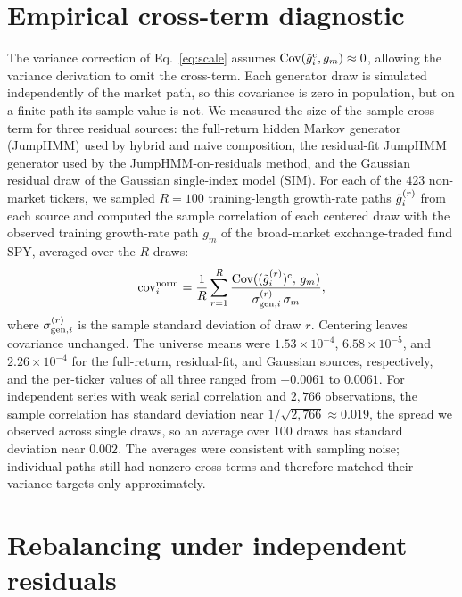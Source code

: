 
\section{Empirical cross-term diagnostic}
\label{sec:supp-cov}

The variance correction of Eq.~\eqref{eq:scale} assumes
$\operatorname{Cov}(\tilde{g}_i^{\mathrm c},g_m)\approx0$, allowing the variance derivation to omit
the cross-term. Each generator draw is simulated independently of the
market path, so this covariance is zero in population, but on a
finite path its sample value is not. We measured the size of the
sample cross-term for three residual sources: the full-return
hidden Markov generator (JumpHMM) used by hybrid and naive composition,
the residual-fit JumpHMM generator used by the JumpHMM-on-residuals
method, and the Gaussian residual draw of the Gaussian single-index model (SIM). For each
of the $423$ non-market tickers, we sampled $R = 100$ training-length
growth-rate paths $\tilde{g}_i^{(r)}$ from each source and computed the
sample correlation of each centered draw with the observed training
growth-rate path $g_m$ of the broad-market exchange-traded fund SPY,
averaged over the $R$ draws:
\begin{equation}
  \mathrm{cov}^{\mathrm{norm}}_i
  = \frac{1}{R} \sum_{r=1}^{R}
    \frac{\operatorname{Cov}((\tilde{g}_i^{(r)})^{\mathrm c},\, g_m)}{\sigma_{\mathrm{gen},i}^{(r)}\, \sigma_m},
\end{equation}
where $\sigma_{\mathrm{gen},i}^{(r)}$ is the sample standard deviation of
draw $r$. Centering leaves covariance unchanged. The universe means were
$1.53\times10^{-4}$, $6.58\times10^{-5}$, and $2.26\times10^{-4}$ for
the full-return, residual-fit, and Gaussian sources, respectively,
and the per-ticker values of all three ranged from $-0.0061$ to
$0.0061$. For independent series with weak serial correlation and $2{,}766$
observations, the sample correlation has standard deviation near $1/\sqrt{2{,}766}
\approx 0.019$, the spread we observed across single draws, so an
average over $100$ draws has standard deviation near $0.002$. The averages were consistent with sampling noise; individual paths still had nonzero cross-terms and therefore matched their variance targets only approximately.

\section{Rebalancing under independent residuals}
\label{sec:supp-bias}

